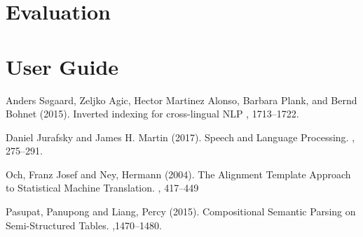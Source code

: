 \documentclass[a4paper]{article}
\begin{document}
\section{Evaluation}
\section{User Guide}
 \newpage
\begin{thebibliography}{99} %

Anders S\o gaard, Zeljko Agic, Hector Martinez Alonso, Barbara Plank, and Bernd Bohnet (2015).
\newblock Inverted indexing for cross-lingual NLP
, 1713--1722.

Daniel Jurafsky and James H. Martin (2017).
\newblock Speech and Language Processing.
, 275--291.

Och, Franz Josef and Ney, Hermann (2004).
\newblock The Alignment Template Approach to Statistical Machine Translation.
, 417--449

Pasupat, Panupong and Liang, Percy (2015).
\newblock Compositional Semantic Parsing on Semi-Structured Tables.
,1470--1480.
 
\end{thebibliography}
\end{document}
